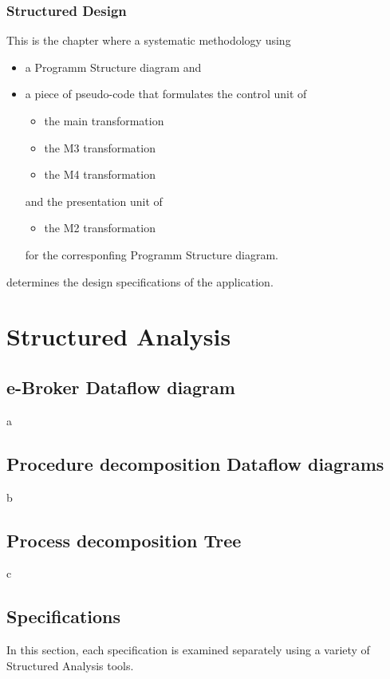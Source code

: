 \documentclass{article}
\begin{document}
\subsubsection{Structured Design}
This is the chapter where a systematic methodology using
\begin{itemize}
\item a Programm Structure diagram and 
\item a piece of pseudo-code that formulates the control unit of
\begin{itemize}[{label=$\circ$}]
\item the main transformation 
\item the M3 transformation 
\item the M4 transformation
\end{itemize}
and the presentation unit of
\begin{itemize}[{label=$\circ$}]
\item the M2 transformation 
\end{itemize}
for the corresponfing Programm Structure diagram.
\end{itemize}
determines the design specifications of the application. 

\newpage
\section{Structured Analysis}
\subsection{e-Broker Dataflow diagram}
a

\subsection{Procedure decomposition Dataflow diagrams}
b

\subsection{Process decomposition Tree}
c

\subsection{Specifications}
In this section, each specification is examined separately using a variety of Structured Analysis tools. 
\end{document}
